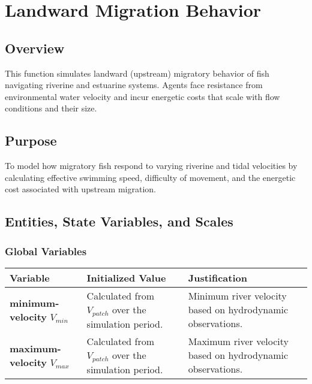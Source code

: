 \documentclass[
]{book}
\begin{document}
\chapter{Landward Migration Behavior}\label{landward-migration-behavior}

\section{Overview}\label{overview-3}

This function simulates landward (upstream) migratory behavior of fish navigating riverine and estuarine systems. Agents face resistance from environmental water velocity and incur energetic costs that scale with flow conditions and their size.

\section{Purpose}\label{purpose-2}

To model how migratory fish respond to varying riverine and tidal velocities by calculating effective swimming speed, difficulty of movement, and the energetic cost associated with upstream migration.

\section{Entities, State Variables, and Scales}\label{entities-state-variables-and-scales-2}

\subsection{Global Variables}\label{global-variables-1}

\begin{longtable}[]{@{}
  >{\centering\arraybackslash}p{}
  >{\centering\arraybackslash}p{}
  >{\centering\arraybackslash}p{}@{}}
\toprule\noalign{}
\begin{minipage}[b]{\linewidth}\centering
Variable
\end{minipage} & \begin{minipage}[b]{\linewidth}\centering
Initialized Value
\end{minipage} & \begin{minipage}[b]{\linewidth}\centering
Justification
\end{minipage} \\
\midrule\noalign{}
\endhead
\bottomrule\noalign{}
\endlastfoot
\textbf{minimum-velocity} \(V_{min}\) & Calculated from \(V_{patch}\) over the simulation period. & Minimum river velocity based on hydrodynamic observations. \\
\textbf{maximum-velocity} \(V_{max}\) & Calculated from \(V_{patch}\) over the simulation period. & Maximum river velocity based on hydrodynamic observations. \\
\end{longtable}
\end{document}
